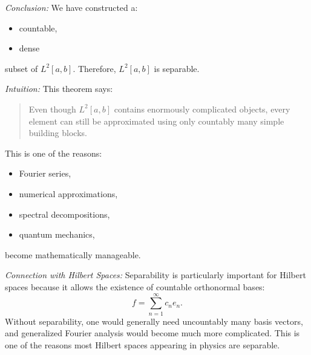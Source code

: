 \documentclass[aps,prl,twocolumn,groupedaddress]{revtex4-2}
\begin{document}
{\em Conclusion:}
We have constructed a:
\begin{itemize}
\item countable,
\item dense
\end{itemize}
subset of $L^2[a,b]$.
Therefore, $L^2[a,b]$ is separable.

{\em Intuition:}
This theorem says:
\begin{quotation}
Even though $L^2[a,b]$ contains enormously complicated objects, every element can still be approximated using only countably many simple building blocks.
\end{quotation}
This is one of the reasons:
\begin{itemize}
\item Fourier series,
\item numerical approximations,
\item spectral decompositions,
\item quantum mechanics,
\end{itemize}
become mathematically manageable.

{\em Connection with Hilbert Spaces:}
Separability is particularly important for Hilbert spaces because it allows the existence of countable orthonormal bases:
$$
f
=
\sum_{n=1}^\infty c_n e_n.
$$
Without separability, one would generally need uncountably many basis vectors, and generalized Fourier analysis would become much more complicated.
This is one of the reasons most Hilbert spaces appearing in physics are separable.
\end{document}

